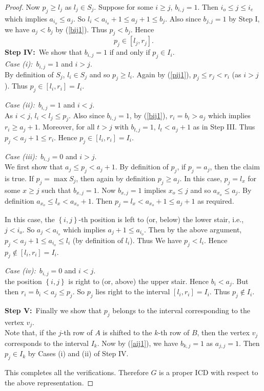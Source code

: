 \documentclass{article}
\theoremstyle{definition}
\numberwithin{equation}{section}
\newcommand{\set}[1]{\left\{#1\right\}}
\begin{document}
\begin{proof}
\vspace{0.5em}\noindent 
Now $p_j\geq l_j$ as $l_j\in S_j$. Suppose for some $i\geq j$, $b_{i,j}=1$. Then $i_o\leq j\leq i_e$ which implies $a_{i_o}\leq a_j$. So $l_i< a_{i_o}+1\leq a_j+1\leq b_j$. Also since $b_{j,j}=1$ by Step I, we have $a_j<b_j$ by (\ref{bij1}). Thus $p_j<b_j$. Hence 
\begin{equation}\label{pij1}
p_j\in [l_j,r_j].
\end{equation}
{\bf Step IV:}\ We show that $b_{i,j}=1$ if and only if $p_j\in I_i$.\\
{\it Case (i):}\ $b_{i,j}=1$ and $i>j$.\\
By definition of $S_j$, $l_i\in S_j$ and so $p_j\geq l_i$. Again by (\ref{pij1}), $p_j\leq r_j<r_i$ (as $i>j$). Thus $p_j\in [l_i,r_i]=I_i$.

\vspace{0.5em}\noindent
{\it Case (ii):}\ $b_{i,j}=1$ and $i<j$.\\
As $i<j$, $l_i<l_j\leq p_j$. Also since $b_{i,j}=1$, by (\ref{bij1}), $r_i=b_i>a_j$ which implies $r_i\geq a_j+1$. Moreover, for all $t>j$ with $b_{t,j}=1$, $l_t<a_j+1$ as in Step III. Thus $p_j<a_j+1\leq r_i$. Hence $p_j\in [l_i,r_i]=I_i$.

\vspace{0.5em}\noindent
{\it Case (iii):}\ $b_{i,j}=0$ and $i>j$.\\
We first show that $a_j\leq p_j<a_j+1$. By definition of $p_j$, if $p_j=a_j$, then the claim is true. If $p_j=\max S_j$, then again by definition $p_j\geq a_j$. In this case, $p_j=l_x$ for some $x\geq j$ such that $b_{x,j}=1$. Now $b_{x,j}=1$ implies $x_o\leq j$ and so $a_{x_o}\leq a_j$. By definition $a_{x_o}\leq l_x<a_{x_o}+1$. Then $p_j=l_x<a_{x_o}+1\leq a_j+1$ as required.

\vspace{0.5em}\noindent
In this case, the $\set{i,j}$-th position is left to (or, below) the lower stair, i.e., $j<i_o$. So $a_j<a_{i_o}$ which implies $a_j+1\leq a_{i_o}$. Then by the above argument, $p_j<a_j+1\leq a_{i_o}\leq l_i$ (by definition of $l_i$). Thus We have $p_j<l_i$. Hence $p_j\notin [l_i,r_i]=I_i$.

\vspace{0.5em}\noindent
{\it Case (iv):}\ $b_{i,j}=0$ and $i<j$.\\
the position $\set{i,j}$ is right to (or, above) the upper stair. Hence $b_i<a_j$. But then $r_i=b_i<a_j\leq p_j$. So $p_j$ lies right to the interval $[l_i,r_i]=I_i$. Thus $p_j\notin I_i$.

\vspace{0.5em}\noindent
{\bf Step V:}\ Finally we show that $p_j$ belongs to the interval corresponding to the vertex $v_j$.\\
Note that, if the $j$-th row of $A$ is shifted to the $k$-th row of $B$, then the vertex $v_j$ corresponds to the interval $I_k$. Now by (\ref{aij1}), we have $b_{k,j}=1$ as $a_{j,j}=1$. Then $p_j\in I_k$ by Cases (i) and (ii) of Step IV.

\vspace{0.5em}\noindent
This completes all the verifications. Therefore $G$ is a proper ICD with respect to the above representation.    
\end{proof}
\end{document}
